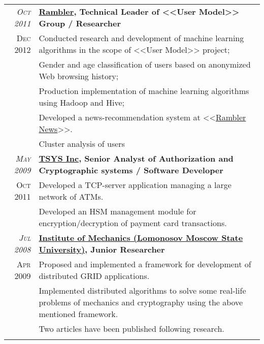 \documentclass[unicode,a4paper,10pt]{article}
\begin{document}
\begin{tabular}{r p{13cm}}
 \emph{\textsc{Oct 2011}} & \textbf{\href{http://www.rambler.ru}{Rambler}, Technical Leader of <<User Model>> Group / Researcher} \\
\textsc{Dec 2012}
&\footnotesize{Conducted research and development of machine learning algorithms in the scope of <<User Model>> project;}\\
&\footnotesize{Gender and age classification of users based on anonymized Web browsing history;}\\
&\footnotesize{Production implementation of machine learning algorithms using Hadoop and Hive;}\\
&\footnotesize{Developed a news-recommendation system at <<\href{http://news.rambler.ru}{Rambler News}>>.}\\
&\footnotesize{Cluster analysis of users}\\


 \emph{\textsc{May 2009}} & \textbf{\href{http://www.tsys.com}{TSYS Inc}, Senior Analyst of Authorization and Cryptographic systems / Software Developer} \\
\textsc{Oct 2011}
&\footnotesize{Developed a TCP-server application managing a large network of ATMs.} \\
&\footnotesize{Developed an HSM management module for encryption/decryption of payment card transactions.} \\

 
 \emph{\textsc{Jul 2008}} & \textbf{\href{http://www.imec.msu.ru/}{Institute of Mechanics (Lomonosov Moscow State University)}, Junior Researcher} \\
\textsc{Apr 2009}
&\footnotesize{Proposed and implemented a framework for development of distributed GRID applications.}\\
&\footnotesize{Implemented distributed algorithms to solve some real-life problems of mechanics and cryptography using the above mentioned framework.}\\
&\footnotesize{Two articles have been published following research.}\\ 
\multicolumn{2}{c}{} 
\end{tabular}
\end{document}
